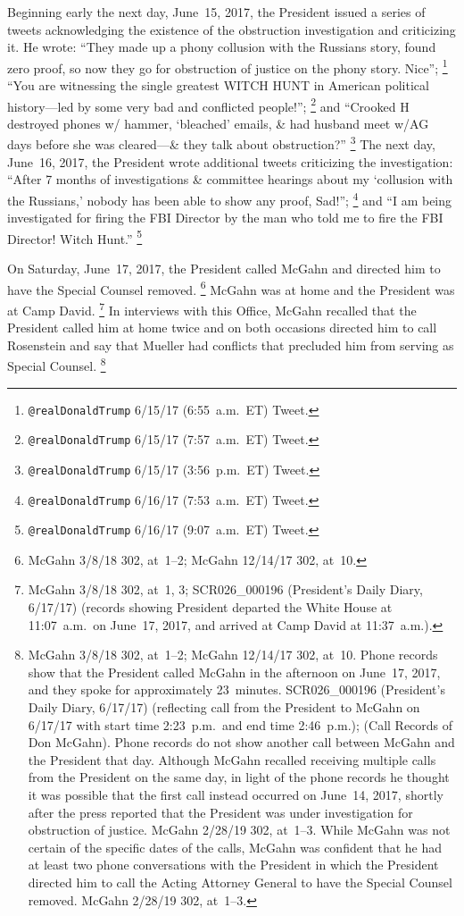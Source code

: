 Beginning early the next day, June~15, 2017, the President issued a series of tweets acknowledging the existence of the obstruction investigation and criticizing it.
He wrote: ``They made up a phony collusion with the Russians story, found zero proof, so now they go for obstruction of justice on the phony story.
Nice'';%
\footnote{\verb+@realDonaldTrump+ 6/15/17 (6:55~a.m.~ET) Tweet.}
``You are witnessing the single greatest WITCH HUNT in American political history---led by some very bad and conflicted people!'';%
\footnote{\verb+@realDonaldTrump+ 6/15/17 (7:57~a.m.~ET) Tweet.}
and ``Crooked H destroyed phones w/ hammer, `bleached' emails, \& had husband meet w/AG days before she was cleared---\& they talk about obstruction?''%
\footnote{\verb+@realDonaldTrump+ 6/15/17 (3:56~p.m.~ET) Tweet.}
The next day, June~16, 2017, the President wrote additional tweets criticizing the investigation:
``After 7 months of investigations \& committee hearings about my `collusion with the Russians,' nobody has been able to show any proof, Sad!'';%
\footnote{\verb+@realDonaldTrump+ 6/16/17 (7:53~a.m.~ET) Tweet.}
and ``I am being investigated for firing the FBI Director by the man who told me to fire the FBI Director!
Witch Hunt.''%
\footnote{\verb+@realDonaldTrump+ 6/16/17 (9:07~a.m.~ET) Tweet.}

On Saturday, June~17, 2017, the President called McGahn and directed him to have the Special Counsel removed.%
\footnote{McGahn 3/8/18 302, at~1--2;
McGahn 12/14/17 302, at~10.}
McGahn was at home and the President was at Camp David.%
\footnote{McGahn 3/8/18 302, at~1, 3;
SCR026\_000196 (President's Daily Diary, 6/17/17) (records showing President departed the White House at 11:07~a.m.\ on June~17, 2017, and arrived at Camp David at 11:37~a.m.).}
In interviews with this Office, McGahn recalled that the President called him at home twice and on both occasions directed him to call Rosenstein and say that Mueller had conflicts that precluded him from serving as Special Counsel.%
\footnote{McGahn 3/8/18 302, at~1--2;
McGahn 12/14/17 302, at~10.
Phone records show that the President called McGahn in the afternoon on June~17, 2017, and they spoke for approximately 23~minutes.
SCR026\_000196 (President's Daily Diary, 6/17/17) (reflecting call from the President to McGahn on 6/17/17 with start time 2:23~p.m.\ and end time 2:46~p.m.);
(Call Records of Don McGahn).
Phone records do not show another call between McGahn and the President that day.
Although McGahn recalled receiving multiple calls from the President on the same day, in light of the phone records he thought it was possible that the first call instead occurred on June~14, 2017, shortly after the press reported that the President was under investigation for obstruction of justice.
McGahn 2/28/19 302, at~1--3.
While McGahn was not certain of the specific dates of the calls, McGahn was confident that he had at least two phone conversations with the President in which the President directed him to call the Acting Attorney General to have the Special Counsel removed.
McGahn 2/28/19 302, at~1--3.}

